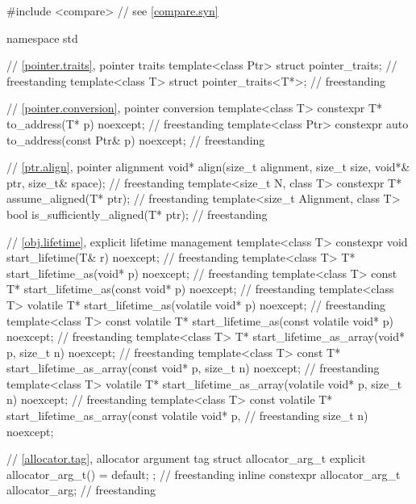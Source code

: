\begin{codeblock}
#include <compare>              // see \ref{compare.syn}

namespace std {
  // \ref{pointer.traits}, pointer traits
  template<class Ptr> struct pointer_traits;                                        // freestanding
  template<class T> struct pointer_traits<T*>;                                      // freestanding

  // \ref{pointer.conversion}, pointer conversion
  template<class T>
    constexpr T* to_address(T* p) noexcept;                                         // freestanding
  template<class Ptr>
    constexpr auto to_address(const Ptr& p) noexcept;                               // freestanding

  // \ref{ptr.align}, pointer alignment
  void* align(size_t alignment, size_t size, void*& ptr, size_t& space);            // freestanding
  template<size_t N, class T>
    constexpr T* assume_aligned(T* ptr);                                            // freestanding
  template<size_t Alignment, class T>
    bool is_sufficiently_aligned(T* ptr);                                           // freestanding

  // \ref{obj.lifetime}, explicit lifetime management
  template<class T>
    constexpr void start_lifetime(T& r) noexcept;                                   // freestanding
  template<class T>
    T* start_lifetime_as(void* p) noexcept;                                         // freestanding
  template<class T>
    const T* start_lifetime_as(const void* p) noexcept;                             // freestanding
  template<class T>
    volatile T* start_lifetime_as(volatile void* p) noexcept;                       // freestanding
  template<class T>
    const volatile T* start_lifetime_as(const volatile void* p) noexcept;           // freestanding
  template<class T>
    T* start_lifetime_as_array(void* p, size_t n) noexcept;                         // freestanding
  template<class T>
    const T* start_lifetime_as_array(const void* p, size_t n) noexcept;             // freestanding
  template<class T>
    volatile T* start_lifetime_as_array(volatile void* p, size_t n) noexcept;       // freestanding
  template<class T>
    const volatile T* start_lifetime_as_array(const volatile void* p,               // freestanding
	                                      size_t n) noexcept;

  // \ref{allocator.tag}, allocator argument tag
  struct allocator_arg_t { explicit allocator_arg_t() = default; };                 // freestanding
  inline constexpr allocator_arg_t allocator_arg{};                                 // freestanding

}
\end{codeblock}
